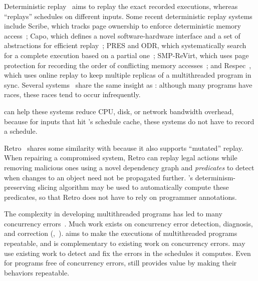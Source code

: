   Deterministic
replay~\cite{r2:osdi,friday2007,srinivasan:flashback,revirt,dejavu,vmware-record-replay,smp-revirt:vee08,pres:sosp09,scribe:sigmetrics10,odr:sosp09,capo:asplos09}
aims to replay the exact recorded executions, whereas \peregrine ``replays''
schedules on different inputs.  Some recent deterministic replay systems
include Scribe, which tracks page ownership to enforce deterministic
memory access~\cite{scribe:sigmetrics10}; Capo, which defines a novel
software-hardware interface and a set of abstractions for efficient
replay~\cite{capo:asplos09}; PRES and ODR, which systematically search for
a complete execution based on a partial one~\cite{pres:sosp09,odr:sosp09};
SMP-ReVirt, which uses page protection for recording the
order of conflicting memory accesses~\cite{smp-revirt:vee08}; and
Respec~\cite{respec:asplos10}, which uses online replay to keep multiple
replicas of a multithreaded program in sync.  Several
systems~\cite{pres:sosp09,respec:asplos10} share the same insight as \peregrine:
although many programs have races, these races tend to occur infrequently.

\peregrine can help these systems reduce CPU, disk, or network bandwidth
overhead, because for inputs that hit \peregrine's schedule cache, these systems
do not have to record a schedule.

Retro~\cite{retro:osdi10} shares some similarity with \peregrine because it also
supports ``mutated'' replay.  When repairing a compromised system, Retro
can replay legal actions while removing malicious ones using a novel
dependency graph and \emph{predicates} to detect when changes to an object
need not be propagated further.  \peregrine's determinism-preserving slicing
algorithm may be used to automatically compute these predicates, so that
Retro does not have to rely on programmer annotations. 

 The complexity in developing multithreaded
programs has led to many concurrency errors~\cite{lu:concurrency-bugs}.
Much work exists on concurrency error
detection, diagnosis, and correction (\eg,~\cite{yu:racetrack:sosp,racerx:sosp03,lu:muvi:sosp,conmem:asplos10,conseq:asplos11,2ndstrike:asplos11,linearizable:eurosys11,ctrigger:asplos09}).  \peregrine aims to make the
executions of multithreaded programs repeatable, and is complementary to
existing work on concurrency errors.  \peregrine may use existing
work to detect and fix the errors in the schedules it computes.
Even for programs free of concurrency errors, \peregrine still provides value by
making their behaviors repeatable.



